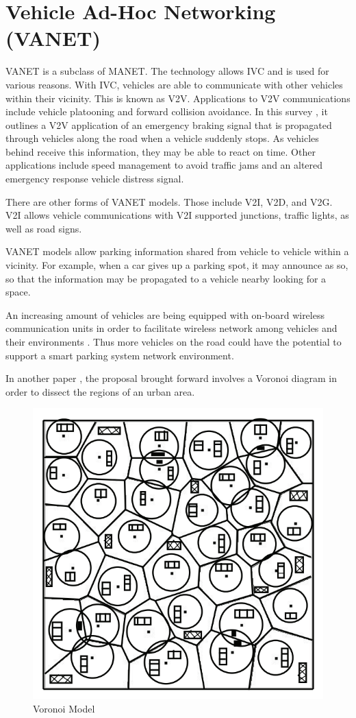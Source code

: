\pagebreak

\section{Vehicle Ad-Hoc Networking (\ac{VANET})}
\ac{VANET} is a subclass of \ac{MANET}. The technology allows \ac{IVC} and is used for various reasons. With \ac{IVC}, vehicles are able to communicate with other vehicles within their vicinity. This is known as \ac{V2V}. Applications to \ac{V2V} communications include vehicle platooning and forward collision avoidance. In this survey \citep{Kiess2007OnCommunication}, it outlines a \ac{V2V} application of an emergency braking signal that is propagated through vehicles along the road when a vehicle suddenly stops. As vehicles behind receive this information, they may be able to react on time. Other applications include speed management to avoid traffic jams and an altered emergency response vehicle distress signal.

There are other forms of \ac{VANET} models. Those include \ac{V2I}, \ac{V2D}, and \ac{V2G}. \ac{V2I} allows vehicle communications with \ac{V2I} supported junctions, traffic lights, as well as road signs.


VANET models allow parking information shared from vehicle to vehicle within a vicinity. For example, when a car gives up a parking spot, it may announce as so, so that the information may be propagated to a vehicle nearby looking for a space.

An increasing amount of vehicles are being equipped with on-board wireless communication units in order to facilitate wireless network among vehicles and their environments \citep{Lin2008SecurityNetworks}. Thus more vehicles on the road could have the potential to support a smart parking system network environment.

In another paper \citep{Panayappan2007VANET-basedAvailability}, the proposal brought forward involves a Voronoi diagram in order to dissect the regions of an urban area.

\begin{figure}[H]
    \centering
    \includegraphics[width=0.5\linewidth]{./Images/VORONOI.png}
    \caption{Voronoi Model}
    \label{figure:voronoi}
\end{figure}

